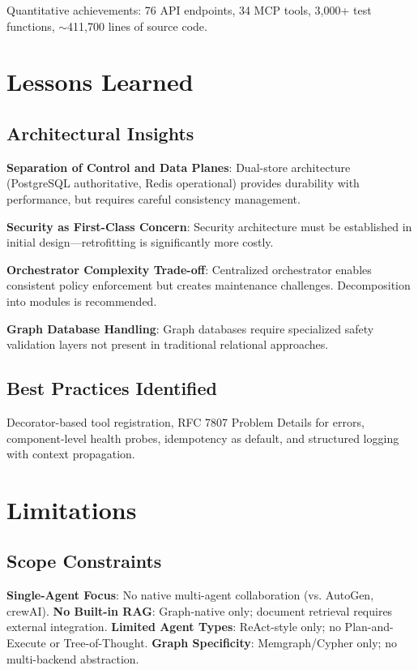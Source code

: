 \documentclass[a4paper,twoside]{sapthesis}
\newcommand{\ToolCount}{34}
\newcommand{\EndpointCount}{76}
\newcommand{\TestCount}{3,000+}
\newcommand{\TotalLOC}{411,700}
\begin{document}
Quantitative achievements: \EndpointCount{} API endpoints, \ToolCount{} MCP tools, \TestCount{} test functions, $\sim$\TotalLOC{} lines of source code.

\section{Lessons Learned}
\label{sec:lessons}

\subsection{Architectural Insights}

\textbf{Separation of Control and Data Planes}: Dual-store architecture (PostgreSQL authoritative, Redis operational) provides durability with performance, but requires careful consistency management.

\textbf{Security as First-Class Concern}: Security architecture must be established in initial design---retrofitting is significantly more costly.

\textbf{Orchestrator Complexity Trade-off}: Centralized orchestrator enables consistent policy enforcement but creates maintenance challenges. Decomposition into modules is recommended.

\textbf{Graph Database Handling}: Graph databases require specialized safety validation layers not present in traditional relational approaches.

\subsection{Best Practices Identified}

Decorator-based tool registration, RFC 7807 Problem Details for errors, component-level health probes, idempotency as default, and structured logging with context propagation.

\section{Limitations}
\label{sec:limitations}

\subsection{Scope Constraints}

\textbf{Single-Agent Focus}: No native multi-agent collaboration (vs. AutoGen, crewAI). \textbf{No Built-in RAG}: Graph-native only; document retrieval requires external integration. \textbf{Limited Agent Types}: ReAct-style only; no Plan-and-Execute or Tree-of-Thought. \textbf{Graph Specificity}: Memgraph/Cypher only; no multi-backend abstraction.
\end{document}
